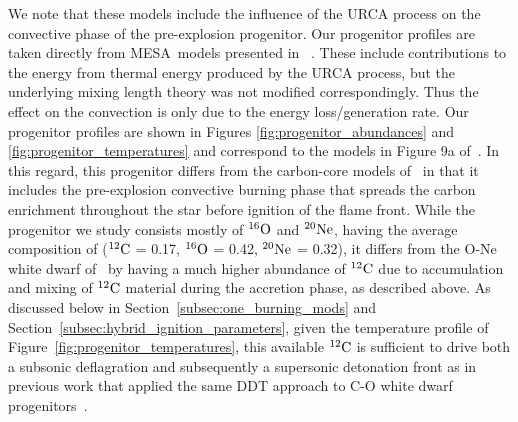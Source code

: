 \documentclass[iop,apj]{emulateapj}
\newcommand{\figref}[1]{Figure~\ref{#1}}
\newcommand{\secref}[1]{Section~\ref{#1}}
\newcommand{\C}[1]{\ensuremath{{}^{#1}{\rm C}}}
\newcommand{\Ox}[1]{\ensuremath{{}^{#1}{\rm O}}}
\newcommand{\Ne}[1]{\ensuremath{{}^{#1}{\rm Ne}}}
\newcommand{\code}[1]{\textsc{#1}}
\newcommand{\MESA}{\code{MESA}}
\begin{document}
We note that these models include the influence of the URCA process on the 
convective phase of the pre-explosion progenitor. Our progenitor profiles are
taken directly from \MESA\ models presented in ~\citet{denissenkovetal2015}. 
These include contributions to the energy from thermal energy produced
by the URCA process, but the underlying mixing length theory was not 
modified correspondingly. Thus the effect on the convection is only
due to the energy loss/generation rate. Our progenitor profiles are
shown in Figures \ref{fig:progenitor_abundances} and \ref{fig:progenitor_temperatures}
and correspond to the models in Figure 9a of~\citet{denissenkovetal2015}.
In this regard, this progenitor differs from the carbon-core
models of~\citet{kromeretal2015} in that it includes the pre-explosion convective
burning phase that spreads the carbon enrichment throughout the star before
ignition of the flame front.
While the progenitor we study consists mostly of \Ox{16}
  and \Ne{20}, having the average composition of (\C{12} = 0.17,
  \Ox{16} = 0.42, \Ne{20} = 0.32), it differs from the O-Ne white
  dwarf of~\citet{marquardtetal2015} by having a much higher abundance
  of \C{12} due to accumulation and mixing of \C{12} material during
  the accretion phase, as described above. As discussed below in
  \secref{subsec:one_burning_mods} and
  \secref{subsec:hybrid_ignition_parameters}, given the temperature
  profile of \figref{fig:progenitor_temperatures}, this available
  \C{12} is sufficient to drive both a subsonic deflagration and
  subsequently a supersonic detonation front as in previous work that
  applied the same DDT approach to C-O white dwarf
  progenitors~\citep{kruegetal12}.
\end{document}
